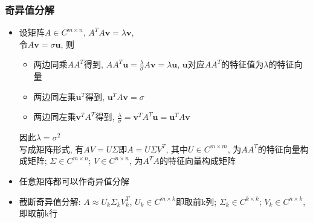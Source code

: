 \documentclass[UTF8]{article}
\begin{document}
\subsubsection{奇异值分解}
\begin{itemize}
\item 设矩阵$A\in C^{m\times n}$, $A^TA\bm{v}=\lambda\bm{v}$, \\
	令$A\bm{v}=\sigma\bm{u}$, 则
	\begin{itemize}
	\item 两边同乘$AA^T$得到, $AA^T\bm{u}=\frac{\lambda}{\sigma}A\bm{v}=\lambda\bm{u}$, $\bm{u}$对应$AA^T$的特征值为$\lambda$的特征向量
	\item 两边同左乘$\bm{u}^T$得到, $\bm{u}^TA\bm{v}=\sigma$
	\item 两边同左乘$\bm{v}^TA^T$得到, $\frac{\lambda}{\sigma}=\bm{v}^TA^T\bm{u}=\bm{u}^TA\bm{v}$
	\end{itemize}
	因此$\lambda=\sigma^2$\\
	写成矩阵形式, 有$AV=U\Sigma$即$A=U\Sigma V^T$, 其中$U\in C^{m\times m}$, 为$AA^T$的特征向量构成矩阵; $\Sigma\in C^{m\times n}$; $V\in C^{n\times n}$, 为$A^TA$的特征向量构成矩阵
\item 任意矩阵都可以作奇异值分解
\item 截断奇异值分解: $A\approx U_k\Sigma_kV_k^T$, $U_k\in C^{m\times k}$即取前k列; $\Sigma_k\in C^{k\times k}$; $V_k\in C^{n\times k}$, 即取前k行
\end{itemize}
\end{document}
